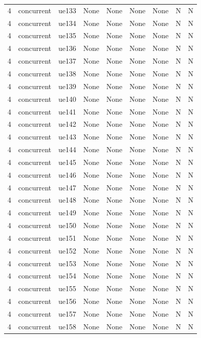 \begin{table}[ht]
\begin{tabular}{|c|c|c|c|c|c|c|c|c|}
4 & concurrent & ue133 & None & None & None & None & N & N \\
4 & concurrent & ue134 & None & None & None & None & N & N \\
4 & concurrent & ue135 & None & None & None & None & N & N \\
4 & concurrent & ue136 & None & None & None & None & N & N \\
4 & concurrent & ue137 & None & None & None & None & N & N \\
4 & concurrent & ue138 & None & None & None & None & N & N \\
4 & concurrent & ue139 & None & None & None & None & N & N \\
4 & concurrent & ue140 & None & None & None & None & N & N \\
4 & concurrent & ue141 & None & None & None & None & N & N \\
4 & concurrent & ue142 & None & None & None & None & N & N \\
4 & concurrent & ue143 & None & None & None & None & N & N \\
4 & concurrent & ue144 & None & None & None & None & N & N \\
4 & concurrent & ue145 & None & None & None & None & N & N \\
4 & concurrent & ue146 & None & None & None & None & N & N \\
4 & concurrent & ue147 & None & None & None & None & N & N \\
4 & concurrent & ue148 & None & None & None & None & N & N \\
4 & concurrent & ue149 & None & None & None & None & N & N \\
4 & concurrent & ue150 & None & None & None & None & N & N \\
4 & concurrent & ue151 & None & None & None & None & N & N \\
4 & concurrent & ue152 & None & None & None & None & N & N \\
4 & concurrent & ue153 & None & None & None & None & N & N \\
4 & concurrent & ue154 & None & None & None & None & N & N \\
4 & concurrent & ue155 & None & None & None & None & N & N \\
4 & concurrent & ue156 & None & None & None & None & N & N \\
4 & concurrent & ue157 & None & None & None & None & N & N \\
4 & concurrent & ue158 & None & None & None & None & N & N \\

\end{tabular}
\end{table}
